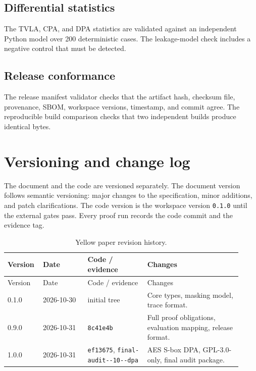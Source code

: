 \documentclass[11pt,a4paper]{article}
\newcommand{\evidencetag}{\texttt{final-\allowbreak audit-\allowbreak 2026-10-\allowbreak 31-\allowbreak dpa}}
\newcommand{\code}[1]{\texttt{#1}}
\theoremstyle{plain}
\theoremstyle{definition}
\theoremstyle{remark}
\begin{document}
\subsection{Differential statistics}

The TVLA, CPA, and DPA statistics are validated against an independent Python model
over 200 deterministic cases. The leakage-model check includes a negative control that
must be detected.

\subsection{Release conformance}

The release manifest validator checks that the artifact hash, checksum file,
provenance, SBOM, workspace versions, timestamp, and commit agree. The reproducible
build comparison checks that two independent builds produce identical bytes.

\section{Versioning and change log}\label{sec:versioning}

The document and the code are versioned separately. The document version follows
semantic versioning: major changes to the specification, minor additions, and patch
clarifications. The code version is the workspace version \code{0.1.0} until the
external gates pass. Every proof run records the code commit and the evidence tag.

\small
\begin{longtable}{@{}p{0.12\linewidth}p{0.18\linewidth}p{0.24\linewidth}p{0.38\linewidth}@{}}
\caption{Yellow paper revision history.}\label{tab:history}\\
\toprule
Version & Date & Code / evidence & Changes \\
\midrule
\endfirsthead
\toprule
Version & Date & Code / evidence & Changes \\
\midrule
\endhead
0.1.0 & 2026-10-30 & initial tree & Core types, masking model, trace format. \\
0.9.0 & 2026-10-31 & \code{8c41e4b} & Full proof obligations, evaluation mapping, release format. \\
1.0.0 & 2026-10-31 & \code{ef13675}, \evidencetag & AES S-box DPA, GPL-3.0-only, final audit package. \\
\bottomrule
\end{longtable}

\appendix
\end{document}
